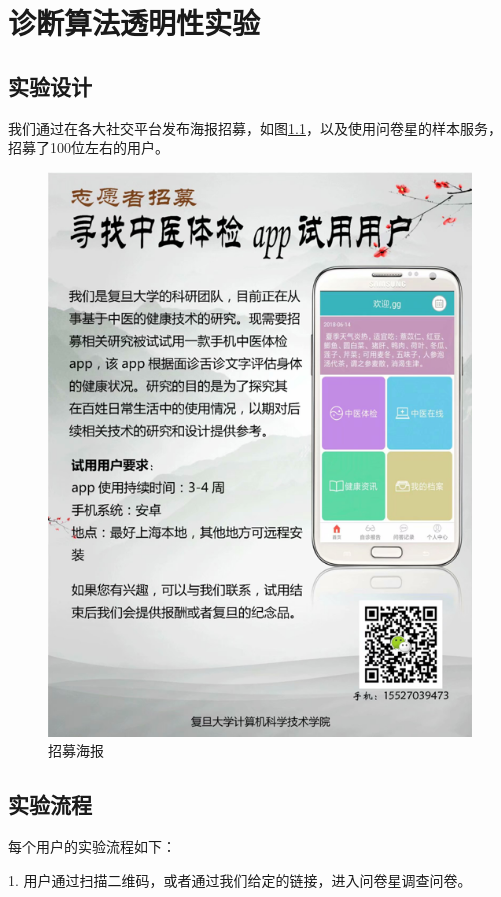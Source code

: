 \chapter{诊断算法透明性实验}

\section{实验设计}
我们通过在各大社交平台发布海报招募，如图\ref{fig:poster}，以及使用问卷星的样本服务，招募了100位左右的用户。
\begin{figure}
    \centering
    \includegraphics{images/poster.png}
    \caption{招募海报}
    \label{fig:poster}
\end{figure}
\section{实验流程}
每个用户的实验流程如下：

1. 用户通过扫描二维码，或者通过我们给定的链接，进入问卷星调查问卷。

